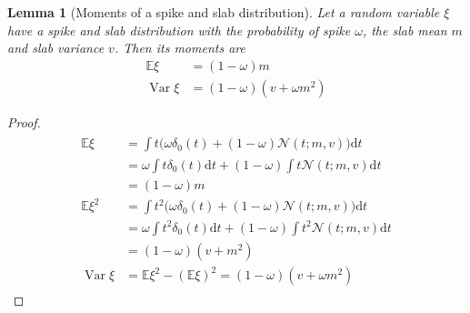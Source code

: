 \documentclass{article}
\newtheorem{lemma}{Lemma}
\begin{document}
\begin{lemma}[Moments of a spike and slab distribution]
\label{thm:moments_spsl}
Let a random variable $\xi$ have a spike and slab distribution with the probability of spike $\omega$, the slab mean $m$ and slab variance $v$. Then its moments are
\begin{subequations}
\begin{align}
\mathbb{E}\xi &= (1-\omega)m \\
\operatorname{Var}\xi & = (1-\omega)(v + \omega m^2)
\end{align}
\end{subequations}
\end{lemma}

\begin{proof}
\begin{align*}
\begin{split}
\mathbb{E}\xi &= \int t \big(\omega \delta_0(t) + (1 - \omega)\mathcal{N}(t; m, v)\big)\mathrm{d}t \\
& = \omega \int t \delta_0(t)\mathrm{d}t + (1 - \omega)\int t \mathcal{N}(t; m, v)\mathrm{d}t \\
& = (1-\omega)m \\
\mathbb{E}\xi^2 &= \int t^2 \big(\omega \delta_0(t) + (1 - \omega)\mathcal{N}(t; m, v)\big)\mathrm{d}t \\
& = \omega \int t^2 \delta_0(t)\mathrm{d}t + (1 - \omega)\int t^2 \mathcal{N}(t; m, v)\mathrm{d}t \\
& = (1-\omega)(v + m^2) \\
\operatorname{Var}\xi &= \mathbb{E}\xi^2 - \left(\mathbb{E}\xi\right)^2 = (1-\omega)(v + \omega m^2)
\end{split}
\end{align*}
\end{proof}
\end{document}

